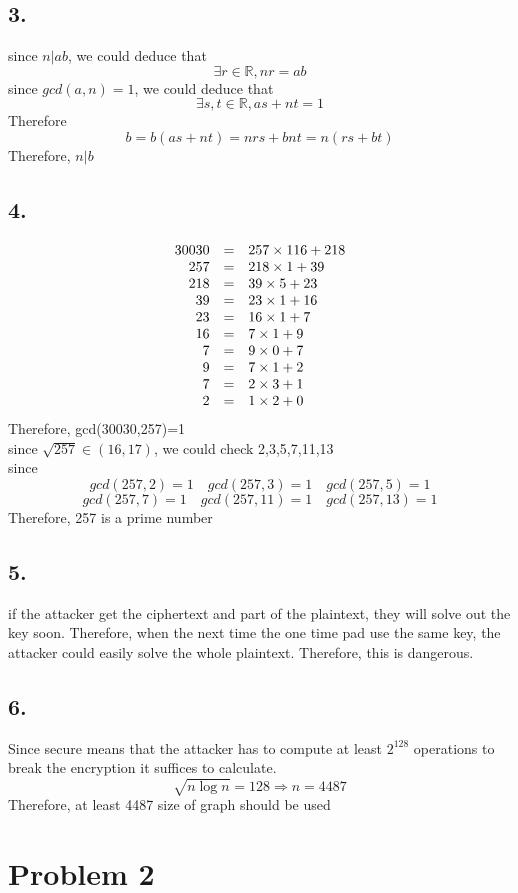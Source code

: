 \documentclass[a4paper,12pt]{journal}
\begin{document}
\subsection*{3.}
since $n|ab$, we could deduce that 
$$\exists r\in\mathbb{R}, nr=ab$$
since $gcd(a,n)=1$, we could deduce that
$$\exists s,t\in\mathbb{R},as+nt=1$$
Therefore
$$b=b(as+nt)=nrs+bnt=n(rs+bt)$$
Therefore, $n|b$
\subsection*{4. }
\begin{equation}
\begin{array}{r c l}
30030&=&257\times 116+218\\
257&=&218\times 1+39\\
218&=&39\times5+ 23\\
39&=&23\times 1+16\\
23&=&16\times 1 +7\\
16&=&7\times 1+9\\
7&=&9\times 0+7\\
9&=&7\times 1+2\\
7&=&2\times 3+1\\
2&=&1\times 2+0\\
\end{array}
\end{equation}
Therefore, gcd(30030,257)=1\\
since $\sqrt{257}\in(16,17)$, we could check 2,3,5,7,11,13\\
since
$$gcd(257,2)=1\quad gcd(257,3)=1\quad gcd(257,5)=1$$
$$ gcd(257,7)=1\quad gcd(257,11)=1\quad gcd(257,13)=1$$
Therefore, 257 is a prime number
\subsection*{5.}
if the attacker get the ciphertext and part of the plaintext, they will solve out the key soon. Therefore, when the next time the one time pad use the same key, the attacker could easily solve the whole plaintext. Therefore, this is dangerous.
\subsection*{6. }
Since secure means that the attacker has to compute at least $2^128$ operations to break the encryption it suffices to calculate.
$$\sqrt{n\log n}=128\Rightarrow n=4487$$
Therefore, at least 4487 size of graph should be used
\section*{Problem 2}
\end{document}
